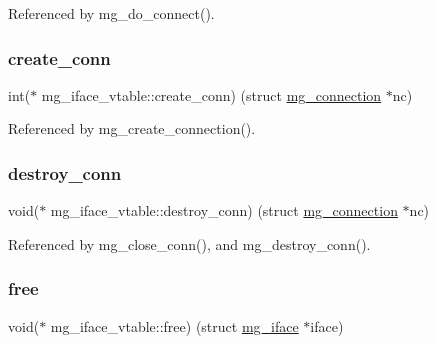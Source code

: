 Referenced by mg\+\_\+do\+\_\+connect().

\mbox{\label{structmg__iface__vtable_a06792b088f508f37cca62ffa1a6ca133_a06792b088f508f37cca62ffa1a6ca133}} 
\subsubsection{\texorpdfstring{create\+\_\+conn}{create\_conn}}
{\footnotesize\ttfamily int($\ast$ mg\+\_\+iface\+\_\+vtable\+::create\+\_\+conn) (struct \hyperlink{structmg__connection}{mg\+\_\+connection} $\ast$nc)}



Referenced by mg\+\_\+create\+\_\+connection().

\mbox{\label{structmg__iface__vtable_a807f493abe8b61ee2188b36a16a5ecd0_a807f493abe8b61ee2188b36a16a5ecd0}} 
\subsubsection{\texorpdfstring{destroy\+\_\+conn}{destroy\_conn}}
{\footnotesize\ttfamily void($\ast$ mg\+\_\+iface\+\_\+vtable\+::destroy\+\_\+conn) (struct \hyperlink{structmg__connection}{mg\+\_\+connection} $\ast$nc)}



Referenced by mg\+\_\+close\+\_\+conn(), and mg\+\_\+destroy\+\_\+conn().

\mbox{\label{structmg__iface__vtable_a267ee7de0f5c3f0eedee5ee5d093a810_a267ee7de0f5c3f0eedee5ee5d093a810}} 
\subsubsection{\texorpdfstring{free}{free}}
{\footnotesize\ttfamily void($\ast$ mg\+\_\+iface\+\_\+vtable\+::free) (struct \hyperlink{structmg__iface}{mg\+\_\+iface} $\ast$iface)}



